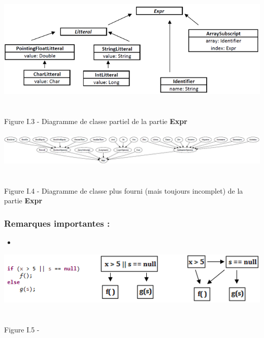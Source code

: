 \documentclass{report}
\begin{document}
\paragraph{}
\hspace{4mm}\textnormal{}

\begin{center}
\includegraphics[scale=0.9]{data/expr1.png}
~\\~\\Figure I.3 - Diagramme de classe partiel de la partie \textbf{Expr}
\end{center}

\paragraph{}
\hspace{4mm}\textnormal{}

\begin{center}
\includegraphics[scale=0.5]{data/expr2.png}
~\\~\\Figure I.4 - Diagramme de classe plus fourni (mais toujours incomplet) de la partie \textbf{Expr}
\end{center}

\subsubsection{Remarques importantes :}

\vspace{4mm}
\begin{itemize}
\item \vspace{1mm}
\end{itemize}

\begin{center}
\includegraphics[scale=0.85]{data/fail-fast.png}
~\\~\\Figure I.5 - 
\end{center}
\end{document}
